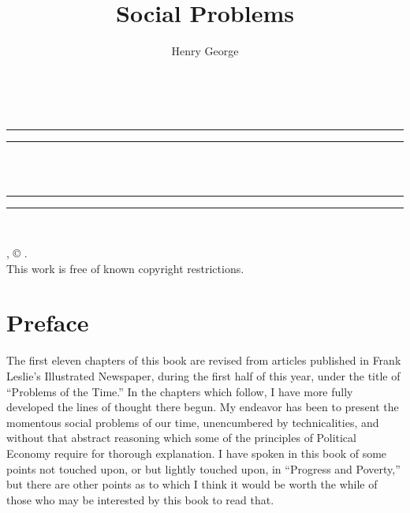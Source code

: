 \documentclass{book}
\date{}
\title{Social Problems}
\author{Henry George}
\begin{document}
\thispagestyle{empty}
\begin{center}
	{\Huge \@title   \\[5mm]}
\end{center}
\newpage
\thispagestyle{empty}
\cleardoublepage
\begin{center}
	\thispagestyle{empty}
	\vspace*{\baselineskip}
	\rule{\textwidth}{1.6pt}\vspace*{-\baselineskip}\vspace*{2pt}
	\rule{\textwidth}{0.4pt}\\[\baselineskip]
	{\Huge\scshape \@title   \\[5mm]}
	{\Large }
	\rule{\textwidth}{0.4pt}\vspace*{-\baselineskip}\vspace{3.2pt}
	\rule{\textwidth}{1.6pt}\\[\baselineskip]
	\vspace*{4\baselineskip}
	{\Large \@author}
	\vfill
\end{center}
\pagebreak
\newpage
\thispagestyle{empty}
\null\vfill
\noindent
\begin{center}
	{\emph{\@title}, © \@author.\\[5mm]}
	{This work is free of known copyright restrictions.\\[5mm]}
\end{center}
\pagebreak
\newpage
\setcounter{tocdepth}{0}
\setcounter{secnumdepth}{0}

\chapter*{Preface}
\label{chapter-0}
The first eleven chapters of this book are revised from articles published in Frank Leslie’s Illustrated Newspaper, during the first half of this year, under the title of “Problems of the Time.” In the chapters which follow, I have more fully developed the lines of thought there begun. My endeavor has been to present the momentous social problems of our time, unencumbered by technicalities, and without that abstract reasoning which some of the principles of Political Economy require for thorough explanation. I have spoken in this book of some points not touched upon, or but lightly touched upon, in “Progress and Poverty,” but there are other points as to which I think it would be worth the while of those who may be interested by this book to read that.
\end{document}
